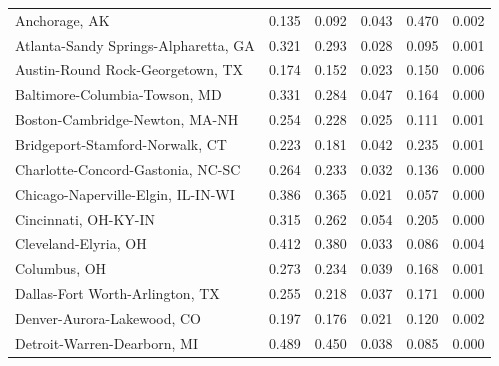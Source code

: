 \documentclass[
  10pt,
]{article}
\begin{document}
\begin{longtable}{lrrrrr}
\bottomrule
\endlastfoot
                               Anchorage, AK &              0.135 &              0.092 &                 0.043 &           0.470 &       0.002 \\
        Atlanta-Sandy Springs-Alpharetta, GA &              0.321 &              0.293 &                 0.028 &           0.095 &       0.001 \\
            Austin-Round Rock-Georgetown, TX &              0.174 &              0.152 &                 0.023 &           0.150 &       0.006 \\
               Baltimore-Columbia-Towson, MD &              0.331 &              0.284 &                 0.047 &           0.164 &       0.000 \\
              Boston-Cambridge-Newton, MA-NH &              0.254 &              0.228 &                 0.025 &           0.111 &       0.001 \\
             Bridgeport-Stamford-Norwalk, CT &              0.223 &              0.181 &                 0.042 &           0.235 &       0.001 \\
           Charlotte-Concord-Gastonia, NC-SC &              0.264 &              0.233 &                 0.032 &           0.136 &       0.000 \\
          Chicago-Naperville-Elgin, IL-IN-WI &              0.386 &              0.365 &                 0.021 &           0.057 &       0.000 \\
                        Cincinnati, OH-KY-IN &              0.315 &              0.262 &                 0.054 &           0.205 &       0.000 \\
                        Cleveland-Elyria, OH &              0.412 &              0.380 &                 0.033 &           0.086 &       0.004 \\
                                Columbus, OH &              0.273 &              0.234 &                 0.039 &           0.168 &       0.001 \\
             Dallas-Fort Worth-Arlington, TX &              0.255 &              0.218 &                 0.037 &           0.171 &       0.000 \\
                  Denver-Aurora-Lakewood, CO &              0.197 &              0.176 &                 0.021 &           0.120 &       0.002 \\
                 Detroit-Warren-Dearborn, MI &              0.489 &              0.450 &                 0.038 &           0.085 &       0.000 \\

\end{longtable}
\end{document}
